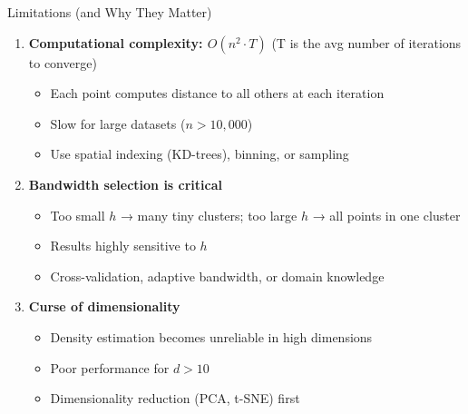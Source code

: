 \begin{frame}{Limitations (and Why They Matter)}
    \begin{enumerate}
        \item \textbf{Computational complexity: $O(n^2 \cdot T)$} (T is the avg number of iterations to converge) 
        \begin{itemize}
            \item[\textcolor{customred}{Why?}] Each point computes distance to all others at each iteration
            \item[\textcolor{customred}{Impact:}] Slow for large datasets ($n > 10{,}000$)
            \item[\textcolor{orange}{Mitigation:}] Use spatial indexing (KD-trees), binning, or sampling
        \end{itemize}

        \vspace{0.3cm}

        \item \textbf{Bandwidth selection is critical}
        \begin{itemize}
            \item[\textcolor{customred}{Why?}] Too small $h$ → many tiny clusters; too large $h$ → all points in one cluster
            \item[\textcolor{customred}{Impact:}] Results highly sensitive to $h$
            \item[\textcolor{orange}{Mitigation:}] Cross-validation, adaptive bandwidth, or domain knowledge
        \end{itemize}

        \vspace{0.3cm}

        \item \textbf{Curse of dimensionality}
        \begin{itemize}
            \item[\textcolor{customred}{Why?}] Density estimation becomes unreliable in high dimensions
            \item[\textcolor{customred}{Impact:}] Poor performance for $d > 10$
            \item[\textcolor{orange}{Mitigation:}] Dimensionality reduction (PCA, t-SNE) first
        \end{itemize}
    \end{enumerate}
\end{frame}

